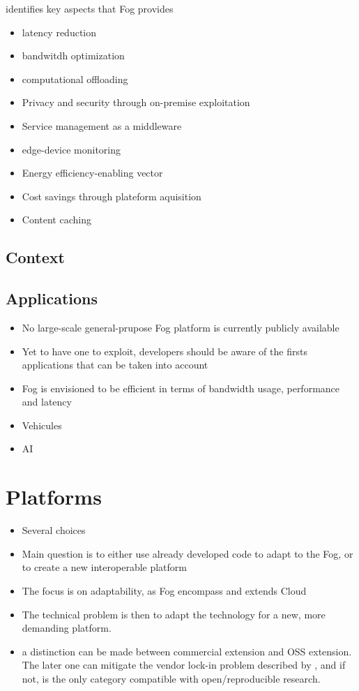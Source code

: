 \documentclass[11pt]{sdm}
\begin{document}
\citet{ahmed_fog_2019} identifies key aspects that Fog provides
\begin{itemize}
	\item latency reduction
	\item bandwitdh optimization
	\item computational offloading
	\item Privacy and security through on-premise exploitation
	\item Service management as a middleware
	\item edge-device monitoring
	\item Energy efficiency-enabling vector
	\item Cost savings through plateform aquisition
	\item Content caching
\end{itemize}

\subsection {Context}
\subsection {Applications}
\begin{itemize}
	\item No large-scale general-prupose Fog platform is currently publicly available \cite{ahmed_fog_2019}
	\item Yet to have one to exploit, developers should be aware of the firsts applications that can be taken into account
	\item Fog is envisioned to be efficient in terms of bandwidth usage, performance and latency
\end{itemize}
\begin{itemize}
    \item Vehicules
    \item \gls{AI}
\end{itemize}

\section{Platforms}
\begin{itemize}
    \item Several choices
    \item Main question is to either use already developed code to adapt to the Fog, or to create a new interoperable platform
    \item The focus is on adaptability, as Fog encompass and extends Cloud
    \item The technical problem is then to adapt the technology for a new, more demanding platform.
    \item a distinction can be made between commercial extension and \gls{OSS} extension. The later one can mitigate the vendor lock-in problem described by \citet{kjorveziroski_iot_2021}, and if not, is the only category compatible with open/reproducible research.
\end{itemize}
\end{document}
